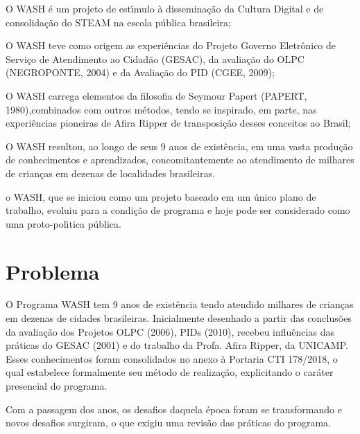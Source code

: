 \documentclass[
12pt,		%
openright,	%
twoside,  %
a4paper,			%
chapter=TITLE,		%
english,			%
french,				%
spanish,			%
brazil				%
]{USPSC-classe/USPSC}
\begin{document}
\begin{alineas}
\item O WASH \'e um projeto de est\'{\i}mulo \`a dissemina\c{c}\~ao da Cultura Digital e de consolida\c{c}\~ao do STEAM na escola p\'ublica brasileira;
\item O WASH teve como origem as experi\^encias do Projeto Governo Eletr\^onico de Servi\c{c}o de Atendimento ao Cidad\~ao (GESAC), da avalia\c{c}\~ao do OLPC (NEGROPONTE, 2004) e da Avalia\c{c}\~ao do PID (CGEE, 2009);
\item O WASH carrega elementos da filosofia de Seymour Papert (PAPERT, 1980),combinados com outros m\'etodos, tendo se inspirado, em parte, nas experi\^encias pioneiras de Afira Ripper de transposi\c{c}\~ao desses conceitos ao Brasil;
\item O WASH resultou, ao longo de seus 9 anos de exist\^encia, em uma vasta produ\c{c}\~ao de conhecimentos e aprendizados, concomitantemente ao atendimento de milhares de crian\c{c}as em dezenas de localidades brasileiras.
\item o WASH, que se iniciou como um projeto baseado em um \'unico plano de trabalho, evoluiu para a condi\c{c}\~ao de programa e hoje pode ser considerado como uma proto-pol\'{\i}tica p\'ublica.
\end{alineas}

\section[Problema]{Problema}\label{Problema}
O Programa WASH tem 9 anos de exist\^encia tendo atendido milhares de crian\c{c}as em dezenas de cidades brasileiras. Inicialmente desenhado a partir das conclus\~oes da avalia\c{c}\~ao dos Projetos OLPC (2006), PIDs (2010), recebeu influ\^encias das pr\'aticas do GESAC (2001) e do trabalho da Profa. Afira Ripper, da UNICAMP. Esses conhecimentos foram consolidados no anexo \`a Portaria CTI 178/2018, o qual estabelece formalmente seu m\'etodo de realiza\c{c}\~ao, explicitando o car\'ater presencial do programa.









Com a passagem dos anos, os desafios daquela \'epoca foram se transformando e novos desafios surgiram, o que exigiu uma revis\~ao das pr\'aticas do programa.
\end{document}

